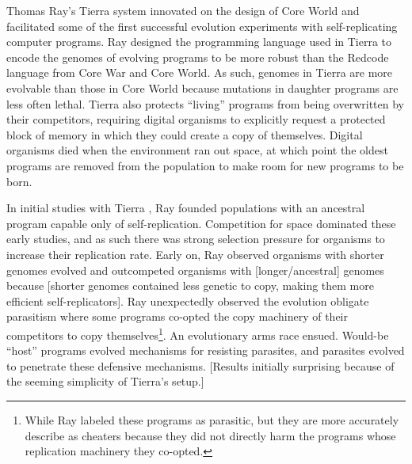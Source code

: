 Thomas Ray's Tierra system \citep{ray_approach_1991} innovated on the design of Core World and facilitated some of the first successful evolution experiments with self-replicating computer programs.
Ray designed the programming language used in Tierra to encode the genomes of evolving programs to be more robust than the Redcode language from Core War and Core World.
As such, genomes in Tierra are more evolvable than those in Core World because mutations in daughter programs are less often lethal.
Tierra also protects ``living'' programs from being overwritten by their competitors, requiring digital organisms to explicitly request a protected block of memory in which they could create a copy of themselves. 
Digital organisms died when the environment ran out space, at which point the oldest programs are removed from the population to make room for new programs to be born. 

In initial studies with Tierra \citep{ray_approach_1991}, Ray founded populations with an ancestral program capable only of self-replication.
Competition for space dominated these early studies, and as such there was strong selection pressure for organisms to increase their replication rate. 
Early on, Ray observed organisms with shorter genomes evolved and outcompeted organisms with [longer/ancestral] genomes because [shorter genomes contained less genetic to copy, making them more efficient self-replicators].
Ray unexpectedly observed the evolution obligate parasitism where some programs co-opted the copy machinery of their competitors to copy themselves\footnote{While Ray labeled these programs as parasitic, but they are more accurately describe as cheaters because they did not directly harm the programs whose replication machinery they co-opted.}. 
An evolutionary arms race ensued.
Would-be ``host'' programs evolved mechanisms for resisting parasites, and parasites evolved to penetrate these defensive mechanisms.
[Results initially surprising because of the seeming simplicity of Tierra's setup.]


